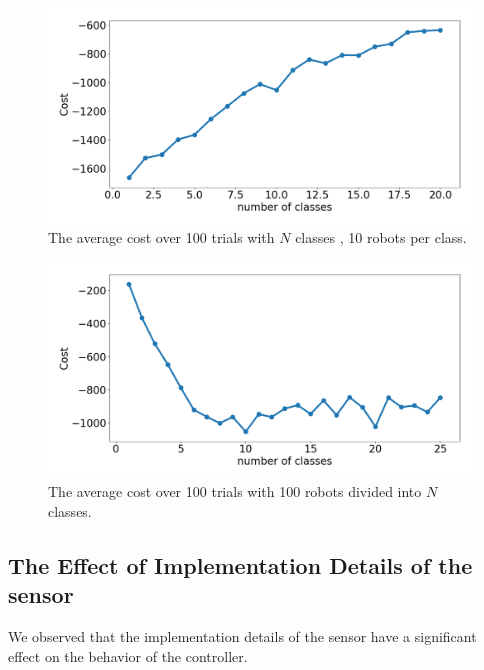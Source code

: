 \documentclass[letterpaper, 10 pt, conference]{ieeeconf}
\begin{document}
\begin{figure}[t]
  \centering
  \includegraphics[width=1\linewidth]{./images/num_classes_vs_cost_10_per_class.png}
  \caption{The average cost over 100 trials with $N$ classes , 10 robots per class.}
  \label{fig:num_classes_10}
\end{figure}

\begin{figure}[t]
  \centering
  \includegraphics[width=1\linewidth]{./images/num_classes_vs_cost_100_robots.png}
  \caption{The average cost over 100 trials with 100 robots divided into $N$ classes.}
  \label{fig:num_classes_100}
\end{figure}

\subsection{The Effect of Implementation Details of the sensor} \label{section:sensor_impl}

We observed that the implementation details of the sensor have a significant
effect on the behavior of the controller.
\end{document}
